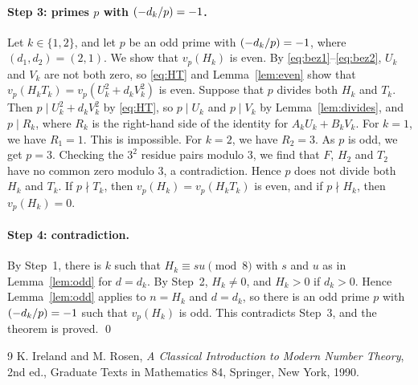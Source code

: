\documentclass[11pt]{article}
\newcommand{\leg}[2]{\mathchoice{\biggl(\dfrac{#1}{#2}\biggr)}{(#1/#2)}{(#1/#2)}{(#1/#2)}}
\begin{document}
\paragraph{Step 3: primes $p$ with $\leg{-d_k}{p}=-1$.} Let $k\in\{1,2\}$, and let $p$ be an odd prime with $\leg{-d_k}{p}=-1$, where $(d_{1},d_{2})=(2,1)$. We show that $v_p(H_k)$ is even. By \eqref{eq:bez1}--\eqref{eq:bez2}, $U_k$ and $V_k$ are not both zero, so \eqref{eq:HT} and Lemma~\ref{lem:even} show that $v_p(H_kT_k)=v_p(U_k^2+d_kV_k^2)$ is even. Suppose that $p$ divides both $H_k$ and $T_k$. Then $p\mid U_k^2+d_kV_k^2$ by \eqref{eq:HT}, so $p\mid U_k$ and $p\mid V_k$ by Lemma~\ref{lem:divides}, and $p\mid R_k$, where $R_k$ is the right-hand side of the identity for $A_kU_k+B_kV_k$. For $k=1$, we have $R_{1}=1$. This is impossible. For $k=2$, we have $R_{2}=3$. As $p$ is odd, we get $p=3$. Checking the $3^2$ residue pairs modulo $3$, we find that $F$, $H_{2}$ and $T_{2}$ have no common zero modulo $3$, a contradiction. Hence $p$ does not divide both $H_k$ and $T_k$. If $p\nmid T_k$, then $v_p(H_k)=v_p(H_kT_k)$ is even, and if $p\nmid H_k$, then $v_p(H_k)=0$.

\paragraph{Step 4: contradiction.} By Step~1, there is $k$ such that $H_k\equiv su\pmod{8}$ with $s$ and $u$ as in Lemma~\ref{lem:odd} for $d=d_k$. By Step~2, $H_k\neq0$, and $H_k>0$ if $d_k>0$. Hence Lemma~\ref{lem:odd} applies to $n=H_k$ and $d=d_k$, so there is an odd prime $p$ with $\leg{-d_k}{p}=-1$ such that $v_p(H_k)$ is odd. This contradicts Step~3, and the theorem is proved.
\qed

\begin{thebibliography}{9}
 K. Ireland and M. Rosen, \emph{A Classical Introduction to Modern Number Theory}, 2nd ed., Graduate Texts in Mathematics 84, Springer, New York, 1990.
\end{thebibliography}
\end{document}
